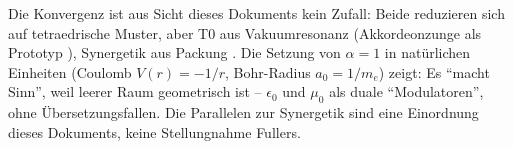 	\begin{table}[htbp]
		\caption{Konvergenzen: T0 und Synergetik – erweitert um Dualitätselemente}
		\label{tab:konvergenz}
	\end{table}
	
	Die Konvergenz ist aus Sicht dieses Dokuments kein Zufall: Beide reduzieren sich auf tetraedrische Muster, aber T0 aus Vakuumresonanz (Akkordeonzunge als Prototyp \cite{ricot2005}), Synergetik aus Packung \cite{fuller1975}. Die Setzung von $\alpha=1$ in natürlichen Einheiten (Coulomb $V(r) = -1/r$, Bohr-Radius $a_0 = 1/m_e$) zeigt: Es ``macht Sinn'', weil leerer Raum geometrisch ist – $\epsilon_0$ und $\mu_0$ als duale ``Modulatoren'', ohne Übersetzungsfallen. Die Parallelen zur Synergetik sind eine Einordnung dieses Dokuments, keine Stellungnahme Fullers.
	
